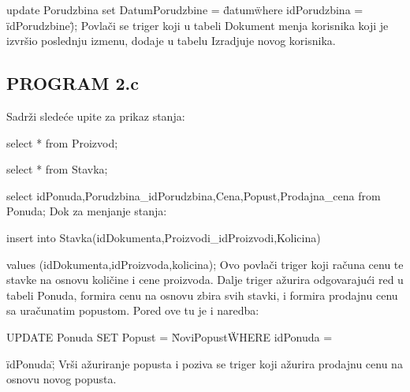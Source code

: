 update Porudzbina set DatumPorudzbine = \"datum\" where idPorudzbina = \"idPorudzbine\");
\newline
Povlači se triger koji u tabeli Dokument menja korisnika koji je izvršio poslednju izmenu, dodaje u tabelu Izradjuje novog korisnika.

\subsection{PROGRAM 2.c}
Sadrži sledeće upite za prikaz stanja:

select * from Proizvod;

select * from Stavka;

select idPonuda,Porudzbina\_idPorudzbina,Cena,Popust,Prodajna\_cena from Ponuda;
\newline
Dok za menjanje stanja:

insert into Stavka(idDokumenta,Proizvodi\_idProizvodi,Kolicina)

values (idDokumenta,idProizvoda,kolicina);
\newline
Ovo povlači triger koji računa cenu te stavke na osnovu količine i cene proizvoda. Dalje triger ažurira odgovarajući red u tabeli Ponuda, formira cenu na osnovu zbira svih stavki, i formira prodajnu cenu sa uračunatim popustom.
\newline
Pored ove tu je i naredba:

UPDATE Ponuda SET Popust = \"NoviPopust\" WHERE idPonuda =

\"idPonuda\";
\newline
Vrši ažuriranje popusta i poziva se triger koji ažurira prodajnu cenu na osnovu novog popusta.